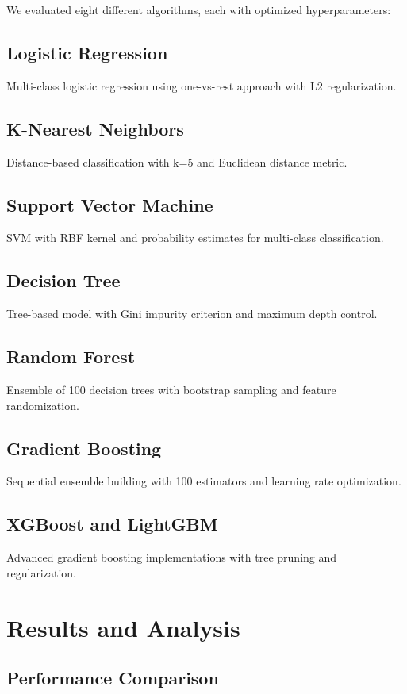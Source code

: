 \documentclass[conference]{IEEEtran}
\begin{document}
We evaluated eight different algorithms, each with optimized hyperparameters:

\subsection{Logistic Regression}
Multi-class logistic regression using one-vs-rest approach with L2 regularization.

\subsection{K-Nearest Neighbors}
Distance-based classification with k=5 and Euclidean distance metric.

\subsection{Support Vector Machine}
SVM with RBF kernel and probability estimates for multi-class classification.

\subsection{Decision Tree}
Tree-based model with Gini impurity criterion and maximum depth control.

\subsection{Random Forest}
Ensemble of 100 decision trees with bootstrap sampling and feature randomization.

\subsection{Gradient Boosting}
Sequential ensemble building with 100 estimators and learning rate optimization.

\subsection{XGBoost and LightGBM}
Advanced gradient boosting implementations with tree pruning and regularization.

\section{Results and Analysis}

\subsection{Performance Comparison}
\end{document}
